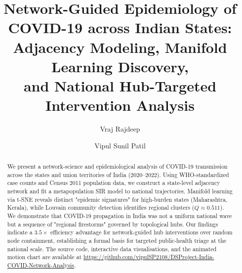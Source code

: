 \documentclass[sigconf]{acmart}
\begin{document}
\title[COVID-19 India: Metapopulation Network Analysis]{%
  Network-Guided Epidemiology of COVID-19 across Indian States:\\
  Adjacency Modeling, Manifold Learning Discovery,\\
  and National Hub-Targeted Intervention Analysis}

\author{Vraj Rajdeep}

\author{Vipul Sunil Patil}
\authornotemark[1]

\renewcommand{\shortauthors}{Rajdeep and Patil}

\begin{abstract}
We present a network-science and epidemiological analysis of COVID-19 transmission across the states and union territories of India (2020--2022). Using WHO-standardized case counts and Census 2011 population data, we construct a state-level adjacency network and fit a metapopulation SIR model to national trajectories. Manifold learning via t-SNE reveals distinct "epidemic signatures" for high-burden states (Maharashtra, Kerala), while Louvain community detection identifies regional clusters ($Q \approx 0.511$). We demonstrate that COVID-19 propagation in India was not a uniform national wave but a sequence of "regional firestorms" governed by topological hubs. Our findings indicate a $3.5\times$ efficiency advantage for network-guided hub interventions over random node containment, establishing a formal basis for targeted public-health triage at the national scale. The source code, interactive data visualisations, and the animated motion chart are available at \url{https://github.com/vipulSP2108/DSProject-India-COVID-Network-Analysis}.
\end{abstract}


\end{document}
